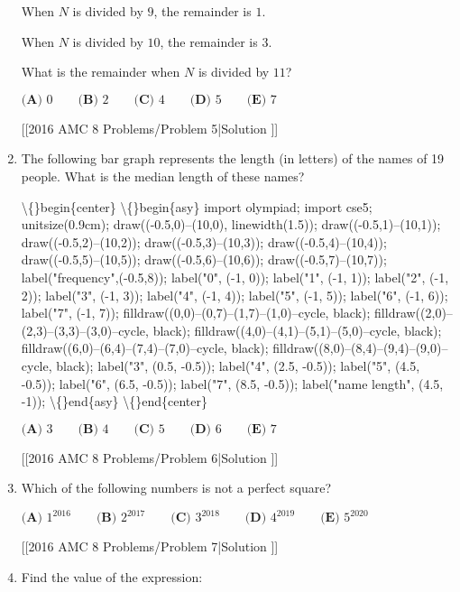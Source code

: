\documentclass{article}
\begin{document}
\begin{enumerate}[label=\arabic*., itemsep=0.5em]
 When \(N\) is divided by \(9\), the remainder is \(1\).

 When \(N\) is divided by \(10\), the remainder is \(3\).

What is the remainder when \(N\) is divided by \(11\)?


\(\textbf{(A) }0\qquad\textbf{(B) }2\qquad\textbf{(C) }4\qquad\textbf{(D) }5\qquad \textbf{(E) }7\)

[[2016 AMC 8 Problems/Problem 5|Solution
]]\par \vspace{0.5em}\item The following bar graph represents the length (in letters) of the names of 19 people. What is the median length of these names?

\textbackslash\{\}begin\{center\}
\textbackslash\{\}begin\{asy\}
import olympiad;
import cse5;
unitsize(0.9cm);
draw((-0.5,0)--(10,0), linewidth(1.5));
draw((-0.5,1)--(10,1));
draw((-0.5,2)--(10,2));
draw((-0.5,3)--(10,3));
draw((-0.5,4)--(10,4));
draw((-0.5,5)--(10,5));
draw((-0.5,6)--(10,6));
draw((-0.5,7)--(10,7));
label("frequency",(-0.5,8));
label("0", (-1, 0));
label("1", (-1, 1));
label("2", (-1, 2));
label("3", (-1, 3));
label("4", (-1, 4));
label("5", (-1, 5));
label("6", (-1, 6));
label("7", (-1, 7));
filldraw((0,0)--(0,7)--(1,7)--(1,0)--cycle, black);
filldraw((2,0)--(2,3)--(3,3)--(3,0)--cycle, black);
filldraw((4,0)--(4,1)--(5,1)--(5,0)--cycle, black);
filldraw((6,0)--(6,4)--(7,4)--(7,0)--cycle, black);
filldraw((8,0)--(8,4)--(9,4)--(9,0)--cycle, black);
label("3", (0.5, -0.5));
label("4", (2.5, -0.5));
label("5", (4.5, -0.5));
label("6", (6.5, -0.5));
label("7", (8.5, -0.5));
label("name length", (4.5, -1));
\textbackslash\{\}end\{asy\}
\textbackslash\{\}end\{center\}


\(\textbf{(A) }3\qquad\textbf{(B) }4\qquad\textbf{(C) }5\qquad\textbf{(D) }6\qquad \textbf{(E) }7\)

[[2016 AMC 8 Problems/Problem 6|Solution
]]\par \vspace{0.5em}\item Which of the following numbers is not a perfect square?

\(\textbf{(A) }1^{2016}\qquad\textbf{(B) }2^{2017}\qquad\textbf{(C) }3^{2018}\qquad\textbf{(D) }4^{2019}\qquad \textbf{(E) }5^{2020}\)

[[2016 AMC 8 Problems/Problem 7|Solution
]]\par \vspace{0.5em}\item Find the value of the expression:


\end{enumerate}
\end{document}
